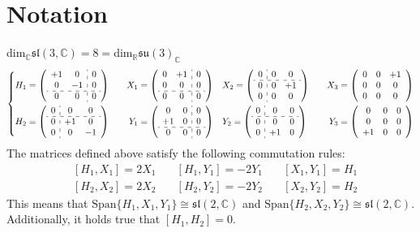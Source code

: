 \documentclass[../main.tex]{subfiles}
\begin{document}
\section{Notation}
dim$_{\mathbb{C}}\mathfrak{sl}(3,\mathbb{C})=8=$dim$_{\mathbb{R}}\mathfrak{su}(3)_{\mathbb{C}}$
\[
\left\{
\begin{aligned}
&H_1=\left(\begin{array}{cc:c}
    +1 & 0 & 0 \\
    0 & -1 & 0 \\
    \hdashline
    0 & 0 & 0
\end{array}\right)
\quad
&X_1=\left(\begin{array}{cc:c}
    0 & +1 & 0 \\
    0 & 0 & 0 \\
    \hdashline
    0 & 0 & 0
\end{array}\right)
\quad
&X_2=\left(\begin{array}{c:cc}
    0 & 0 & 0 \\
    \hdashline
    0 & 0 & +1 \\
    0 & 0 & 0
\end{array}\right)
\quad
&X_3=\left(\begin{array}{ccc}
    0 & 0 & +1 \\
    0 & 0 & 0 \\
    0 & 0 & 0
\end{array}\right)\\
&H_2=\left(\begin{array}{c:cc}
    0 & 0 & 0 \\
    \hdashline
    0 & +1 & 0 \\
    0 & 0 & -1
\end{array}\right)
\quad
&Y_1=\left(\begin{array}{cc:c}
    0 & 0 & 0 \\
    +1 & 0 & 0 \\
    \hdashline
    0 & 0 & 0
\end{array}\right)
\quad
&Y_2=\left(\begin{array}{c:cc}
    0 & 0 & 0 \\
    \hdashline
    0 & 0 & 0 \\
    0 & +1 & 0
\end{array}\right)
\quad
&Y_3=\left(\begin{array}{ccc}
    0 & 0 & 0 \\
    0 & 0 & 0 \\
    +1 & 0 & 0
\end{array}\right)
\end{aligned}
\right.
\]
The matrices defined above satisfy the following commutation rules:
\[
\begin{aligned}
&[H_1,X_1]=2X_1 \quad &[H_1,Y_1]=-2Y_1 \quad &[X_1,Y_1]=H_1\\
&[H_2,X_2]=2X_2 \quad &[H_2,Y_2]=-2Y_2 \quad &[X_2,Y_2]=H_2
\end{aligned}
\]
This means that $\textrm{Span}\{H_1,X_1,Y_1\}\cong\mathfrak{sl}(2,\mathbb{C})$ and $\textrm{Span}\{H_2,X_2,Y_2\}\cong\mathfrak{sl}(2,\mathbb{C})$. Additionally, it holds true that $[H_1,H_2]=0$.
\end{document}
